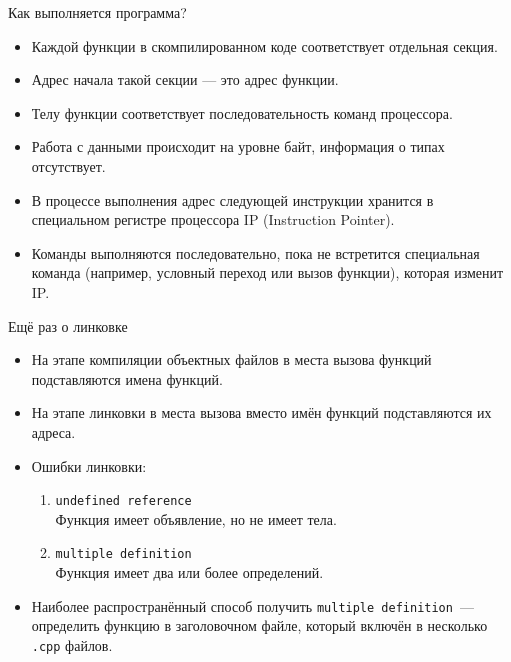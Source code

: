 \documentclass[aspectration=1610,t]{beamer}
\begin{document}
\begin{frame}[fragile]{Как выполняется программа?}
    \begin{itemize}
        \item Каждой функции в скомпилированном коде соответствует отдельная
            секция.
        \item Адрес начала такой секции — это адрес функции.
        \item Телу функции соответствует последовательность команд процессора.
        \item Работа с данными происходит на уровне байт,
            информация о типах отсутствует.
        \item В процессе выполнения адрес следующей инструкции хранится 
            в специальном регистре процессора IP (Instruction Pointer).
        \item Команды выполняются последовательно, пока не встретится
            специальная команда (например, условный переход или вызов 
            функции), которая изменит IP.
    \end{itemize}
\end{frame}

\begin{frame}[fragile]{Ещё раз о линковке}
    \begin{itemize}
        \item На этапе компиляции объектных файлов
            в места вызова функций подставляются имена функций.
        \item На этапе линковки в места вызова вместо имён функций
            подставляются их адреса.
        \item Ошибки линковки:
            \begin{enumerate}
                \item {\tt undefined reference}\\
                    Функция имеет объявление, но не имеет тела.

                \item {\tt multiple definition}\\
                    Функция имеет два или более определений.
            \end{enumerate}
        \item Наиболее распространённый способ получить 
            {\tt multiple definition}~--- определить функцию
            в заголовочном файле, который включён в несколько
            {\tt .cpp} файлов.
    \end{itemize}
\end{frame}
\end{document}
